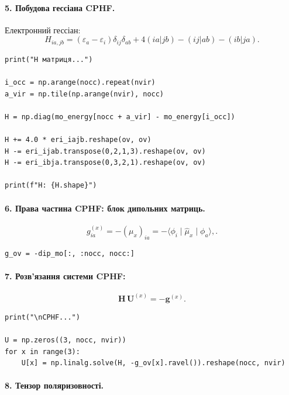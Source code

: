 \paragraph{5. Побудова гессіана CPHF.}

Електронний гессіан:
\[
	H_{ia,jb}
	= (\varepsilon_a - \varepsilon_i)\delta_{ij}\delta_{ab}
	+ 4(ia|jb) - (ij|ab) - (ib|ja).
\]

\begin{verbatim}
print("H матриця...")

i_occ = np.arange(nocc).repeat(nvir)
a_vir = np.tile(np.arange(nvir), nocc)

H = np.diag(mo_energy[nocc + a_vir] - mo_energy[i_occ])

H += 4.0 * eri_iajb.reshape(ov, ov)
H -= eri_ijab.transpose(0,2,1,3).reshape(ov, ov)
H -= eri_ibja.transpose(0,3,2,1).reshape(ov, ov)

print(f"H: {H.shape}")
\end{verbatim}

\paragraph{6. Права частина CPHF: блок дипольних матриць.}

\[
	g^{(x)}_{ia} = - (\mu_x)_{ia} =
	- \langle \phi_i \mid \hat{\mu}_x \mid \phi_a \rangle,.
\]

\begin{verbatim}
g_ov = -dip_mo[:, :nocc, nocc:]
\end{verbatim}

\paragraph{7. Розв'язання системи CPHF:}
\[
	\mathbf{H}\,\mathbf{U}^{(x)} = -\mathbf{g}^{(x)}.
\]

\begin{verbatim}
print("\nCPHF...")

U = np.zeros((3, nocc, nvir))
for x in range(3):
    U[x] = np.linalg.solve(H, -g_ov[x].ravel()).reshape(nocc, nvir)
\end{verbatim}

\paragraph{8. Тензор поляризовності.}

